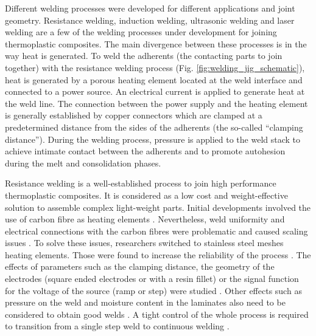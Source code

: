 \documentclass[11pt,review,times]{elsarticle}
\begin{document}
Different welding processes were developed for different applications and joint geometry. 
Resistance welding, induction welding, ultrasonic welding and laser welding are a few of the welding processes under development for joining thermoplastic composites. 
The main divergence between these processes is in the way heat is generated. 
To weld the adherents (the contacting parts to join together) with the resistance welding process (Fig. \ref{fig:welding_jig_schematic}), heat is generated by a porous heating element located at the weld interface and connected to a power source. 
An electrical current is applied to generate heat at the weld line. 
The connection between the power supply and the heating element is generally established by copper connectors which are clamped at a predetermined distance from the sides of the adherents (the so-called “clamping distance”). 
During the welding process, pressure is applied to the weld stack to achieve intimate contact between the adherents and to promote autohesion during the melt and consolidation phases. 

Resistance welding is a well-established process to join high performance thermoplastic composites. 
It is considered as a low cost and weight-effective solution to assemble complex light-weight parts. 
Initial developments involved the use of carbon fibre as heating elements \cite{Ageorges2000a,houghton1984bonding,Eveno1988}. 
Nevertheless, weld uniformity and electrical connections with the carbon fibres were problematic and caused scaling issues \cite{McKnight1997}. 
To solve these issues, researchers switched to stainless steel meshes heating elements. 
Those were found to increase the reliability of the process \cite{Hou1999a}. 
The effects of parameters such as the clamping distance, the geometry of the electrodes (square ended electrodes or with a resin fillet) or the signal function for the voltage of the source (ramp or step) were studied \cite{Dube2007}. 
Other effects such as pressure on the weld and moisture content in the laminates also need to be considered to obtain good welds \cite{Shi2014}. 
A tight control of the whole process is required to transition from a single step weld to continuous welding \cite{Shi2015a}. 
\end{document}

